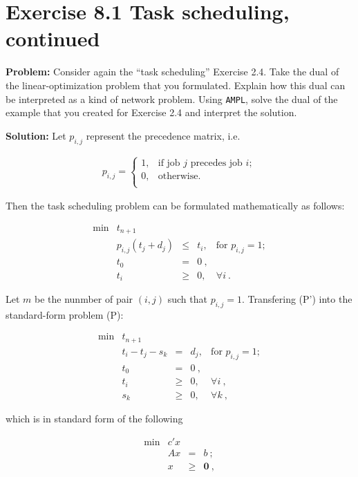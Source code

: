 \section{Exercise 8.1 Task scheduling, continued}
\textbf{Problem:} Consider again the ``task scheduling'' Exercise 2.4. Take the dual of the linear-optimization problem that you formulated. Explain how this dual can be interpreted as a kind of network problem. Using {\tt AMPL}, solve the dual of the example that you created for Exercise
2.4 and interpret the solution.

\textbf{Solution:} Let $p_{i,j}$ represent the precedence matrix, i.e.

\begin{eqnarray}
p_{i,j} =
\begin{cases}
1,   & \text{if job $j$ precedes job $i$}; \\
0,   & \text{otherwise}. \\
\end{cases}
\end{eqnarray}

Then the task scheduling problem can be formulated mathematically as follows:

\[
\tag{P'}
\begin{array}{rrcll}
 \min & t_{n+1}  &  &   & \\
      &  p_{i,j}(t_j + d_j)  &   \leq  & t_i, & \text{for~} p_{i,j} =1; \\
      &  t_0 & = & 0~, & \\
      &  t_i & \geq & 0, & \forall i~.
\end{array}
\]

Let $m$ be the nunmber of pair $(i,j)$ such that $p_{i,j} =1$. Transfering (P') into the standard-form problem (P):

\[
\tag{P}
\begin{array}{rrcll}
 \min & t_{n+1}  &  &   & \\
      &  t_i - t_j - s_k   &   =  & d_j, & \text{for~} p_{i,j} =1; \\
      &  t_0 & = & 0~, & \\
      &  t_i & \geq & 0, & \forall i~, \\
	 &  s_k & \geq & 0, & \forall k~,
\end{array}
\]

which is in standard form of the following

\[
\tag{P}
\begin{array}{rrcl}
 \min & c'x  &      &   \\
      &  Ax  &   =  & b~; \\
      &   x  & \geq & \mathbf{0}~,
\end{array}
\]

